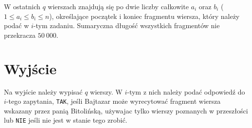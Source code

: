 \documentclass[zad,zawodnik,utf8]{sinol}
\begin{document}
\begin{tasktext}
W ostatnich $q$ wierszach znajdują się po dwie liczby całkowite $a_i$ oraz $b_i$ ($1 \leq a_i \leq b_i \leq n$), określające początek i koniec fragmentu wiersza, który należy podać w $i$-tym zadaniu. Sumaryczna długość wszystkich fragmentów nie przekracza $50~000$. 


  \section{Wyjście}
Na wyjście należy wypisać $q$ wierszy. W $i$-tym z nich należy podać odpowiedź do $i$-tego zapytania, \texttt{TAK}, jeśli Bajtazar może wyrecytować fragment wiersza wskazany przez panią Bitolińską, używajac tylko wierszy poznanych w przeszłości lub \texttt{NIE} jeśli nie jest w stanie tego zrobić.
\makecompactexample 

\end{tasktext}
\end{document}
